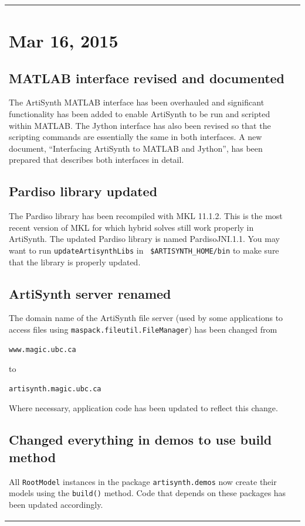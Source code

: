 \documentclass{article}
\begin{document}
\begin{tabular}{ll}
\section*{Mar 16, 2015}

\subsection*{MATLAB interface revised and documented}

The ArtiSynth MATLAB interface has been overhauled and significant
functionality has been added to enable ArtiSynth to be run and
scripted within MATLAB. The Jython interface has also been revised so
that the scripting commands are essentially the same in both
interfaces. A new document,
``Interfacing ArtiSynth to MATLAB and Jython'', has been prepared that
describes both interfaces in detail.

\subsection*{Pardiso library updated}

The Pardiso library has been recompiled with MKL 11.1.2. This is the
most recent version of MKL for which hybrid solves still work properly
in ArtiSynth. The updated Pardiso library is named PardisoJNI.1.1.
You may want to run {\tt updateArtisynthLibs} in {\tt
\$ARTISYNTH\_HOME/bin} to make sure that the library is properly
updated.

\subsection*{ArtiSynth server renamed}

The domain name of the ArtiSynth file server (used by some applications
to access files using {\tt maspack.fileutil.FileManager}) has
been changed from 
\begin{verbatim}
www.magic.ubc.ca
\end{verbatim}
to
\begin{verbatim}
artisynth.magic.ubc.ca
\end{verbatim}
Where necessary, application code has been
updated to reflect this change.

\subsection*{Changed everything in demos to use build method}

All {\tt RootModel} instances in the package {\tt artisynth.demos} now
create their models using the {\tt build()} method. Code that depends
on these packages has been updated accordingly.


\end{tabular}
\end{document}
